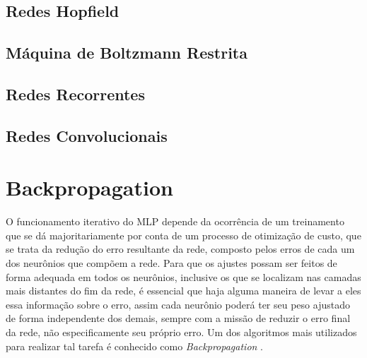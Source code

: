\subsection{Redes Hopfield}
\label{subsec:ann_hopfield_nets}









\subsection{Máquina de Boltzmann Restrita}
\label{subsec:ann_boltzmann_machine}









\subsection{Redes Recorrentes}
\label{subsec:ann_recurrent_nets}









\subsection{Redes Convolucionais}
\label{subsec:ann_convolutional_nets}










\section{Backpropagation}
\label{sec:ann_backpropagation}

O funcionamento iterativo do MLP depende da ocorrência de um treinamento que se dá majoritariamente por conta de um processo de otimização de custo, que se trata da redução do erro resultante da rede, composto pelos erros de cada um dos neurônios que compõem a rede. Para que os ajustes possam ser feitos de forma adequada em todos os neurônios, inclusive os que se localizam nas camadas mais distantes do fim da rede, é essencial que haja alguma maneira de levar a eles essa informação sobre o erro, assim cada neurônio poderá ter seu peso ajustado de forma independente dos demais, sempre com a missão de reduzir o erro final da rede, não especificamente seu próprio erro. Um dos algoritmos mais utilizados para realizar tal tarefa é conhecido como \textit{Backpropagation} \citep{Rumelhart1986, rumelhart1988parallel}.

